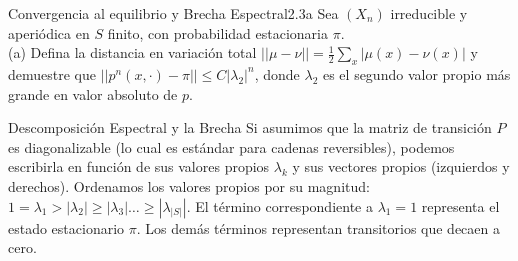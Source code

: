 \documentclass[10pt,a4paper]{article}
\begin{document}
\vspace{5mm}

\begin{ejercicio}{Convergencia al equilibrio y Brecha Espectral}{2.3a}
    Sea $(X_n)$ irreducible y aperiódica en $S$ finito, con probabilidad estacionaria $\pi$. \\
    (a) Defina la distancia en variación total $||\mu - \nu|| = \frac{1}{2} \sum_x |\mu(x) - \nu(x)|$ y demuestre que $||p^n(x, \cdot) - \pi|| \le C|\lambda_2|^n$, donde $\lambda_2$ es el segundo valor propio más grande en valor absoluto de $p$.
\end{ejercicio}

\vspace{2mm}

\begin{nota}{Descomposición Espectral y la Brecha}
    Si asumimos que la matriz de transición $P$ es diagonalizable (lo cual es estándar para cadenas reversibles), podemos escribirla en función de sus valores propios $\lambda_k$ y sus vectores propios (izquierdos y derechos). 
    Ordenamos los valores propios por su magnitud: $1 = \lambda_1 > |\lambda_2| \ge |\lambda_3| \dots \ge |\lambda_{|S|}|$. 
    El término correspondiente a $\lambda_1 = 1$ representa el estado estacionario $\pi$. Los demás términos representan transitorios que decaen a cero.
\end{nota}

\vspace{5mm}
\end{document}
